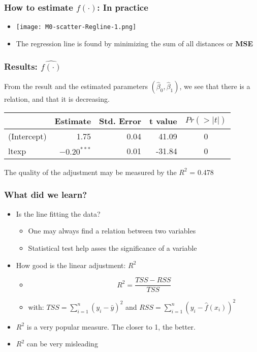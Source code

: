 \documentclass[xcolor=x11names,compress, aspectratio=169]{beamer}
\renewcommand{\(}{\begin{columns}}
\renewcommand{\)}{\end{columns}}
\newcommand{\<}[1]{\begin{column}{#1}}
\renewcommand{\>}{\end{column}}
\begin{document}
\begin{frame} %
\frametitle{How to estimate $f(\cdot)$: In practice}
 \begin{itemize}
  \item<+->[] \texttt{[image: M0-scatter-Regline-1.png]}
  \item<+->[] The regression line is found by minimizing the sum of all distances or \textbf{MSE}
 \end{itemize}
\end{frame}


\begin{frame} %
\frametitle{Results: $ \widehat{f(\cdot)}$}
From the result and the estimated  parameters $ (\widehat \beta_0, \widehat \beta_1)$, we see that there is a relation, and that it is decreasing.
\begin{table}
\centering
\begin{tabular}{l|rrrc}
\hline
  & Estimate & Std. Error & t value & $Pr(>|t|)$\\
\hline
(Intercept) & 1.75 & 0.04 & 41.09 & 0\\
\hline
ltexp &\textbf{ $-0.20^{***}$ }& 0.01 & -31.84 & 0\\
\hline
\end{tabular}
\end{table}
 The quality of the adjustment may be measured by the $R^2$ = 0.478

\end{frame}


\begin{frame} %
\frametitle{What did we learn?}
 \begin{itemize}
  \item<+-> Is the line fitting the data?
   \begin{itemize}
      \item<+->[] One may always find a relation between two variables
      \item<+->[] Statistical test help asses the significance of a variable
  \end{itemize}
  \item<+-> How good is the linear adjustment: $R^2$
  \begin{itemize}
      \item<+->[] $$R^2 = \frac{TSS- RSS}{TSS}$$
      \item<+->[] with:  $TSS= \sum_{i=1}^n (y_i -\bar{y})^2 $ and $RSS= \sum_{i=1}^n (y_i - \widehat{f}(x_i))^2 $
 \end{itemize}
 \item<+-> $R^2$ is a very popular measure. The closer to 1, the better.
 \item<+->  $R^2$  can be very misleading
 \end{itemize}
\end{frame}
\end{document}
